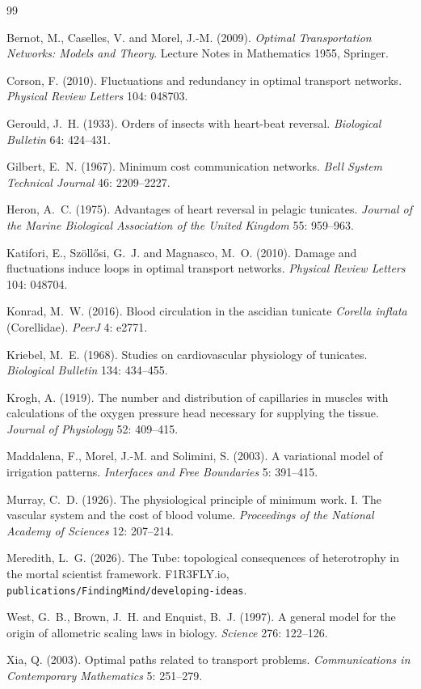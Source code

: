 \documentclass[11pt]{article}
\theoremstyle{plain}
\theoremstyle{definition}
\begin{document}
\begin{thebibliography}{99}

 Bernot, M., Caselles, V. and Morel, J.-M. (2009). \emph{Optimal Transportation
Networks: Models and Theory}. Lecture Notes in Mathematics 1955, Springer.

 Corson, F. (2010). Fluctuations and redundancy in optimal transport networks.
\emph{Physical Review Letters} 104: 048703.

 Gerould, J.~H. (1933). Orders of insects with heart-beat reversal.
\emph{Biological Bulletin} 64: 424--431.

 Gilbert, E.~N. (1967). Minimum cost communication networks. \emph{Bell System
Technical Journal} 46: 2209--2227.

 Heron, A.~C. (1975). Advantages of heart reversal in pelagic tunicates.
\emph{Journal of the Marine Biological Association of the United Kingdom} 55: 959--963.

 Katifori, E., Sz\"oll\H{o}si, G.~J. and Magnasco, M.~O. (2010). Damage and
fluctuations induce loops in optimal transport networks. \emph{Physical Review Letters} 104: 048704.

 Konrad, M.~W. (2016). Blood circulation in the ascidian tunicate \emph{Corella
inflata} (Corellidae). \emph{PeerJ} 4: e2771.

 Kriebel, M.~E. (1968). Studies on cardiovascular physiology of tunicates.
\emph{Biological Bulletin} 134: 434--455.

 Krogh, A. (1919). The number and distribution of capillaries in muscles with
calculations of the oxygen pressure head necessary for supplying the tissue. \emph{Journal of
Physiology} 52: 409--415.

 Maddalena, F., Morel, J.-M. and Solimini, S. (2003). A variational model of
irrigation patterns. \emph{Interfaces and Free Boundaries} 5: 391--415.

 Murray, C.~D. (1926). The physiological principle of minimum work. I. The
vascular system and the cost of blood volume. \emph{Proceedings of the National Academy of Sciences}
12: 207--214.

 Meredith, L.~G. (2026). The Tube: topological consequences of heterotrophy in the
mortal scientist framework. F1R3FLY.io, \texttt{publications/FindingMind/developing-ideas}.

 West, G.~B., Brown, J.~H. and Enquist, B.~J. (1997). A general model for the origin
of allometric scaling laws in biology. \emph{Science} 276: 122--126.

 Xia, Q. (2003). Optimal paths related to transport problems.
\emph{Communications in Contemporary Mathematics} 5: 251--279.

\end{thebibliography}
\end{document}
